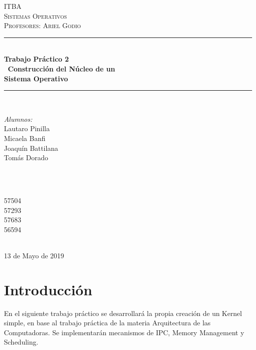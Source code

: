 \documentclass[12pt]{article}
\begin{document}
\begin{titlepage}
\newcommand{\HRule}{\rule{\linewidth}{0.5mm}} 
\center 

\textsc{\LARGE ITBA}\\[1.5cm] 
\textsc{\Large Sistemas Operativos}\\[0.5cm] 
\textsc{\large Profesores: Ariel Godio }\\[0.5cm] 

\HRule \\[0.4cm]
{ \huge \bfseries Trabajo Pr\'actico 2
\\\
Construcci\'on del N\'ucleo de un \\
Sistema Operativo }\\[0.4cm] 
\HRule \\[1.5cm]
 
\begin{minipage}{0.4\textwidth}
\begin{flushleft} \large
\emph{Alumnos:}\\
Lautaro Pinilla \\
Micaela Banfi \\
Joaqu\'in Battilana \\
Tom\'as Dorado \\
\end{flushleft}
\end{minipage}
~
\begin{minipage}{0.4\textwidth}
\begin{flushright} \large
\emph{} \\
57504 \\
57293 \\
57683 \\
56594 \\
\end{flushright}
\end{minipage}\\[2cm]


{\large 13 de Mayo de 2019}\\[2cm]

\vfil
\end{titlepage}

\section{Introducci\'on}
En el siguiente trabajo pr\'actico se desarrollar\'a la propia creaci\'on de un Kernel simple, en base al trabajo pr\'actica de la materia Arquitectura de las Computadoras. Se implementar\'an
mecanismos de IPC, Memory Management y Scheduling.
\end{document}
